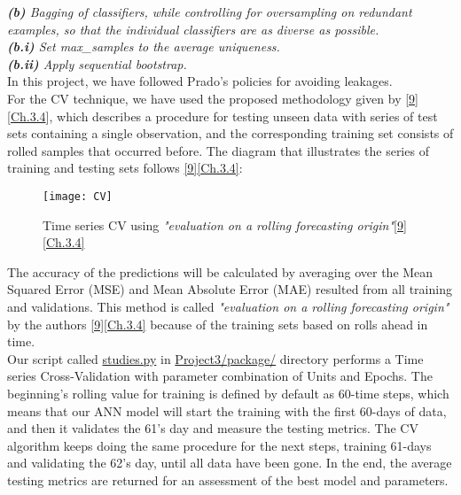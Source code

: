 \qquad \textit{\textbf{(b)} Bagging of classifiers, while controlling for oversampling on redundant examples, so that the individual classifiers are as diverse as possible.}\\

\qquad \qquad \textit{\textbf{(b.i)} Set max\_samples to the average uniqueness.}\\

\qquad \qquad \textit{\textbf{(b.ii)} Apply sequential bootstrap.}\\

In this project, we have followed Prado's policies for avoiding leakages.\\

For the CV technique, we have used the proposed methodology given by \hyperref[Bib:Hyndman, R.J., and Athanasopoulos, G.]{[9]}[\href{https://otexts.com/fpp2/}{Ch.3.4}], which describes a procedure for testing unseen data with series of test sets containing a single observation, and the corresponding training set consists of rolled samples that occurred before. The diagram that illustrates the series of training and testing sets follows \hyperref[Bib:Hyndman, R.J., and Athanasopoulos, G.]{[9][Ch.3.4]}:

\begin{figure}[H]
\label{fig:CV}
\centering
\texttt{[image: CV]}
\caption{Time series CV using \textit{"evaluation on a rolling forecasting origin"}\hyperref[Bib:Hyndman, R.J., and Athanasopoulos, G.]{[9][Ch.3.4]}}
\end{figure}

The accuracy of the predictions will be calculated by averaging over the Mean Squared Error (MSE) and Mean Absolute Error (MAE) resulted from all training and validations. This method is called \textit{"evaluation on a rolling forecasting origin"} by the authors \hyperref[Bib:Hyndman, R.J., and Athanasopoulos, G.]{[9][Ch.3.4]} because of the training sets based on rolls ahead in time.\\

Our script called \href{https://github.com/fabiorodp/UiO-FYS-STK4155/tree/master/Project3/package/studies.py}{studies.py} in \href{https://github.com/fabiorodp/UiO-FYS-STK4155/tree/master/Project3/package/}{Project3/package/} directory performs a Time series Cross-Validation with parameter combination of Units and Epochs. The beginning's rolling value for training is defined by default as 60-time steps, which means that our ANN model will start the training with the first 60-days of data, and then it validates the 61's day and measure the testing metrics. The CV algorithm keeps doing the same procedure for the next steps, training 61-days and validating the 62's day, until all data have been gone. In the end, the average testing metrics are returned for an assessment of the best model and parameters.

